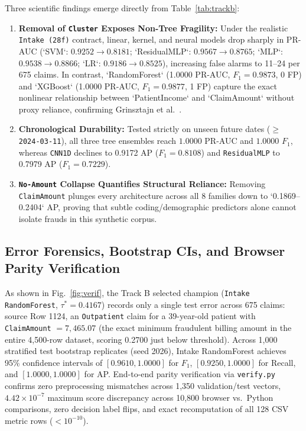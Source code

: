 \documentclass[12pt]{article}
\begin{document}
Three scientific findings emerge directly from Table~\ref{tab:trackb}:
\begin{enumerate}
    \item \textbf{Removal of \texttt{Cluster} Exposes Non-Tree Fragility:} Under the realistic \texttt{Intake (28f)} contract, linear, kernel, and neural models drop sharply in PR-AUC (`SVM`: $0.9252 \to 0.8181$; `ResidualMLP`: $0.9567 \to 0.8765$; `MLP`: $0.9538 \to 0.8866$; `LR`: $0.9186 \to 0.8525$), increasing false alarms to 11--24 per 675 claims. In contrast, `RandomForest` (1.0000 PR-AUC, $F_1=0.9873$, 0 FP) and `XGBoost` (1.0000 PR-AUC, $F_1=0.9877$, 1 FP) capture the exact nonlinear relationship between `PatientIncome` and `ClaimAmount` without proxy reliance, confirming Grinsztajn et al.\ \cite{grinsztajn2022tree}.
    \item \textbf{Chronological Durability:} Tested strictly on unseen future dates ($\ge$ \texttt{2024-03-11}), all three tree ensembles reach $1.0000$ PR-AUC and $1.0000$ $F_1$, whereas \texttt{CNN1D} declines to 0.9172 AP ($F_1=0.8108$) and \texttt{ResidualMLP} to 0.7979 AP ($F_1=0.7229$).
    \item \textbf{\texttt{No-Amount} Collapse Quantifies Structural Reliance:} Removing \texttt{ClaimAmount} plunges every architecture across all 8 families down to `0.1869--0.2404` AP, proving that subtle coding/demographic predictors alone cannot isolate frauds in this synthetic corpus.
\end{enumerate}

\subsection{Error Forensics, Bootstrap CIs, and Browser Parity Verification}
As shown in Fig.~\ref{fig:verif}, the Track B selected champion (\texttt{Intake RandomForest}, $\tau^* = 0.4167$) records only a single test error across 675 claims: source Row 1124, an \texttt{Outpatient} claim for a 39-year-old patient with \texttt{ClaimAmount} $= 7,465.07$ (the exact minimum fraudulent billing amount in the entire 4,500-row dataset, scoring 0.2700 just below threshold). Across 1,000 stratified test bootstrap replicates (seed 2026), Intake RandomForest achieves 95\% confidence intervals of $[0.9610, 1.0000]$ for $F_1$, $[0.9250, 1.0000]$ for Recall, and $[1.0000, 1.0000]$ for AP. End-to-end parity verification via \texttt{verify.py} confirms zero preprocessing mismatches across 1,350 validation/test vectors, $4.42 \times 10^{-7}$ maximum score discrepancy across 10,800 browser vs.\ Python comparisons, zero decision label flips, and exact recomputation of all 128 CSV metric rows ($<10^{-10}$).
\end{document}
